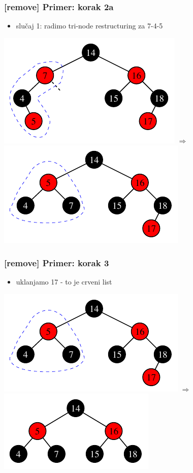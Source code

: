 \documentclass[compress,aspectratio=169]{beamer}
\begin{document}
\begin{frame}[fragile]
  \frametitle{[remove] Primer: korak 2a}
  \begin{itemize}
    \item slučaj 1: radimo tri-node restructuring za 7-4-5
  \end{itemize}
  \begin{center}
    \includegraphics[scale=0.8]{asp-11-del-03.pdf} $\Rightarrow$
    \includegraphics[scale=0.8]{asp-11-del-04.pdf}
  \end{center}
\end{frame}

\begin{frame}[fragile]
  \frametitle{[remove] Primer: korak 3}
  \begin{itemize}
    \item uklanjamo 17 - to je crveni list
  \end{itemize}
  \begin{center}
    \includegraphics[scale=0.8]{asp-11-del-04.pdf} $\Rightarrow$
    \includegraphics[scale=0.8]{asp-11-del-05.pdf}
  \end{center}
\end{frame}
\end{document}
